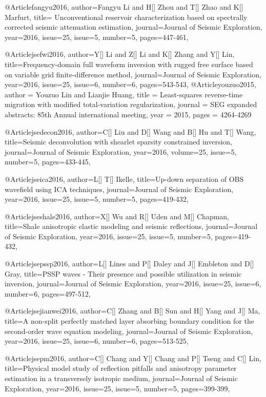@Article{fangyu2016,
  author={Fangyu Li and H[] Zhou and T[] Zhao and K[] Marfurt},
  title={ Unconventional reservoir characterization based on spectrally corrected seismic attenuation estimation},
  journal={Journal of Seismic Exploration},
  year=2016,
  issue=25,
  issue=5,
  number=5,
  pages={447-461},
}

@Article{jsefwi2016,
  author={Y[] Li and Z[] Li and K[] Zhang and Y[] Lin},
  title={Frequency-domain full waveform inversion with rugged free surface based on variable grid finite-difference method},
  journal={Journal of Seismic Exploration},
  year=2016,
  issue=25,
  issue=6,
  number=6,
  pages={543-543},
}
@Article{youzuo2015,
  author = 	 {Youzuo Lin and Lianjie Huang},
  title = 	 {Least-squares reverse-time migration with modified total-variation regularization},
  journal = 	 {SEG expanded abstracts: 85th Annual international meeting},
  year = 	 2015,
  pages =	 {4264-4269}
}


@Article{jsedecon2016,
  author={C[] Liu and D[] Wang and B[] Hu and T[] Wang},
  title={Seismic deconvolution with shearlet sparsity constrained inversion},
  journal={Journal of Seismic Exploration},
  year=2016,
  volume=25,
  issue=5,
  number=5,
  pages={433-445},
}

@Article{jseica2016,
  author={L[] T[] Ikelle},
  title={Up-down separation of OBS wavefield using ICA techniques},
  journal={Journal of Seismic Exploration},
  year=2016,
  issue=25,
  issue=5,
  number=5,
  pages={419-432},
}

@Article{jseshale2016,
  author={X[] Wu and R[] Uden and M[] Chapman},
  title={Shale anisotropic elastic modeling and seismic reflections},
  journal={Journal of Seismic Exploration},
  year=2016,
  issue=25,
  issue=5,
  number=5,
  pages={419-432},
}


@Article{jsepssp2016,
  author={L[] Lines and P[] Daley and J[] Embleton and D[] Gray},
  title={PSSP waves - Their presence and possible utilization in seismic inversion},
  journal={Journal of Seismic Exploration},
  year=2016,
  issue=25,
  issue=6,
  number=6,
  pages={497-512},
}


@Article{jsejianwei2016,
  author={C[] Zhang and B[] Sun and H[] Yang and J[] Ma},
  title={A non-split perfectly matched layer absorbing boundary condition for the second-order wave equation modeling},
  journal={Journal of Seismic Exploration},
  year=2016,
  issue=25,
  issue=6,
  number=6,
  pages={513-525},
}

@Article{jsepm2016,
  author={C[] Chang and Y[] Chang and P[] Tseng and C[] Lin},
  title={Physical model study of reflection pitfalls and anisotropy parameter estimation in a transversely isotropic medium},
  journal={Journal of Seismic Exploration},
  year=2016,
  issue=25,
  issue=5,
  number=5,
  pages={399-399},
}

